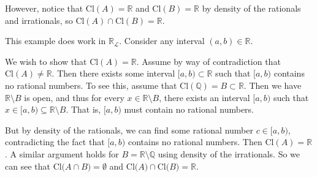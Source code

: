 \documentclass[12pt]{article}
\begin{document}
\begin{enumerate}
However, notice that $\text{Cl}(A) = \mathbb{R}$ and $\text{Cl}(B) = \mathbb{R}$ by density of the rationals and irrationals, so $\text{Cl}(A) \cap \text{Cl}(B) = \mathbb{R}$.

This example does work in $\mathbb{R}_{\mathcal{L}}$. Consider any interval $(a,b) \in \mathbb{R}$. 
 
We wish to show that $\text{Cl}(A) = \mathbb{R}$. Assume by way of contradiction that $\text{Cl}(A) \neq \mathbb{R}$. 
Then there exists some interval $[a,b) \subset \mathbb{R}$ such that $[a,b)$ contains no rational numbers. 
To see this, assume that $\text{Cl}(\mathbb{Q}) = B \subset \mathbb{R}$. 
Then we have $\mathbb{R} \setminus B$ is open, and thus for every $x \in \mathbb{R} \setminus B$, there exists an interval $[a,b)$ such that $x \in [a,b) \subseteq \mathbb{R} \setminus B$.
That is, $[a,b)$ must contain no rational numbers.

But by density of the rationals, we can find some rational number $c \in [a,b)$, contradicting the fact that $[a,b)$ contains no rational numbers. 
Then $\text{Cl}(A) = \mathbb{R}$.
A similar argument holds for $B = \mathbb{R} \setminus \mathbb{Q}$ using density of the irrationals. 
So we can see that $\text{Cl($A\cap B$)} = \emptyset$ and $\text{Cl($A$)} \cap \text{Cl($B$)} = \mathbb{R}$.

\end{enumerate}
\end{document}
